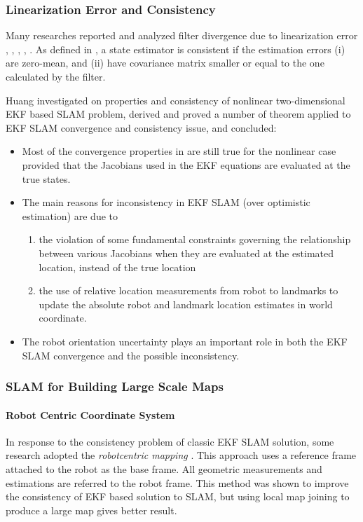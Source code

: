 \subsubsection{Linearization Error and Consistency}

Many researches reported and analyzed filter divergence due to
linearization error \cite{martinelli_results_2005},
\cite{julier_counter_2001}, \cite{bailey_consistency_2006},
\cite{frese_discussion_2006}, \cite{castellanos_limits_2004}. As
defined in \cite{huang_analysis_2008}, a state estimator is consistent
if the estimation errors (i) are zero-mean, and (ii) have covariance
matrix smaller or equal to the one calculated by the filter.

Huang investigated \cite{huang_convergence_2007} on properties and
consistency of nonlinear two-dimensional EKF based SLAM problem,
derived and proved a number of theorem applied to EKF SLAM convergence
and consistency issue, and concluded:

\begin{itemize}
  \item Most of the convergence properties in
  \cite{dissanayake_solution_2001} are still true for the nonlinear
  case provided that the Jacobians used in the EKF equations are
  evaluated at the true states.
  \item The main reasons for inconsistency in EKF SLAM (over
  optimistic estimation) are due to 
  \begin{enumerate}
    \item the violation of some fundamental constraints governing the
    relationship between various Jacobians when they are evaluated at
    the estimated location, instead of the true location
    \item the use of relative location measurements from robot to
    landmarks to update the absolute robot and landmark location
    estimates in world coordinate.
  \end{enumerate}
  \item The robot orientation uncertainty plays an important role in
  both the EKF SLAM convergence and the possible inconsistency. 
\end{itemize}

\subsubsection{SLAM for Building Large Scale Maps}

\paragraph{Robot Centric Coordinate System}In response to the
consistency problem of classic EKF SLAM solution, some research
adopted the \emph{robotcentric mapping} \cite{castellanos_limits_2004}
\cite{civera_1-point_2009}. This approach uses a reference frame
attached to the robot as the base frame. All geometric measurements
and estimations are referred to the robot frame. This method was shown
to improve the consistency of EKF based solution to SLAM, but using
local map joining to produce a large map gives better result. 

